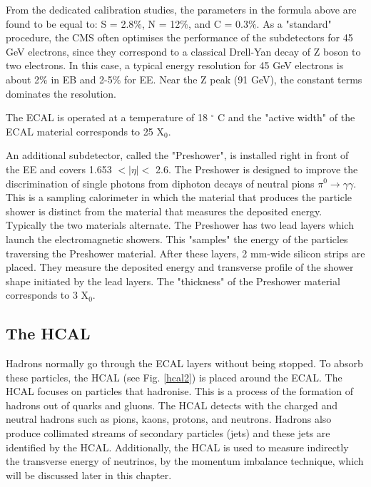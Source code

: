 \begin{normalsize}
From the dedicated calibration studies, the parameters in the formula above are found to be equal to: S = 2.8$\%$, N = 12$\%$, and C = 0.3$\%$. As a "standard" procedure, the CMS often optimises the performance of the subdetectors for 45 GeV electrons, since they correspond to a classical Drell-Yan decay of Z boson to two electrons. In this case, a typical energy resolution for 45 GeV electrons is about 2$\%$ in EB and 2-5$\%$ for EE. Near the Z peak (91 GeV), the constant terms dominates the resolution.


The ECAL is operated at a temperature of 18 $^{\circ}$ C and the "active width" of the ECAL material corresponds to 25 X$_0$. 

An additional subdetector, called the "Preshower", is installed right in front of the EE and covers 1.653 $ < | \eta |  < $ 2.6. The Preshower is designed to improve the discrimination of single photons from diphoton decays of neutral pions $\pi^0 \rightarrow \gamma \gamma$. This is a sampling calorimeter in which the material that produces the particle shower is distinct from the material that measures the deposited energy. Typically the two materials alternate. 
The Preshower has two lead layers which launch the electromagnetic showers. This "samples" the energy of the particles traversing the Preshower material.  After these layers, 2 mm-wide silicon strips are placed. They measure the deposited energy and transverse profile of the shower shape initiated by the lead layers. The "thickness" of the Preshower material corresponds to 3 X$_0$.



\subsection{The HCAL}

Hadrons normally go through the ECAL layers without being stopped. To absorb these particles, the HCAL \cite{HCAL_TDR} (see Fig. \ref{hcal2}) is placed around the ECAL. The HCAL focuses on particles that hadronise. This is a process of the formation of hadrons out of quarks and gluons. The HCAL detects with the charged and neutral hadrons such as pions, kaons, protons, and neutrons. Hadrons also produce collimated streams of secondary particles (jets) and these jets are identified by the HCAL. Additionally, the HCAL is used to measure indirectly the transverse energy of neutrinos, by the momentum imbalance technique, which will be discussed later in this chapter. 


\end{normalsize}
